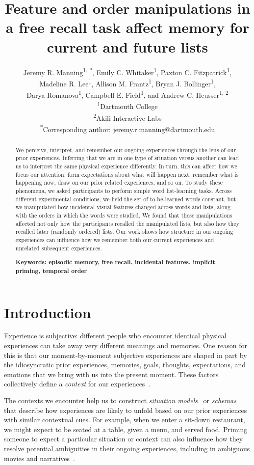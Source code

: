 \documentclass[11pt]{article}
\title{\Large Feature and order manipulations in a free recall task affect memory for current and future lists}
\author{Jeremy R. Manning\textsuperscript{1, *}, Emily C.
Whitaker\textsuperscript{1}, Paxton C. Fitzpatrick\textsuperscript{1},
\\Madeline R. Lee\textsuperscript{1}, Allison M. Frantz\textsuperscript{1},
Bryan J. Bollinger\textsuperscript{1},\\Darya Romanova\textsuperscript{1},
Campbell E. Field\textsuperscript{1}, and Andrew C. Heusser\textsuperscript{1,
2}\\\textsuperscript{1}Dartmouth College\\\textsuperscript{2}Akili
Interactive Labs\\\textsuperscript{*}Corresponding author:
jeremy.r.manning@dartmouth.edu}
\date{}
\begin{document}
\maketitle

\begin{abstract} \footnotesize{We perceive, interpret, and remember our ongoing
experiences through the lens of our prior experiences. Inferring that we are in
one type of situation versus another can lead us to interpret the same physical
experience differently. In turn, this can affect how we focus our attention,
form expectations about what will happen next, remember what is happening now,
draw on our prior related experiences, and so on. To study these phenomena, we
asked participants to perform simple word list-learning tasks. Across different
experimental conditions, we held the set of to-be-learned words constant, but
we manipulated how incidental visual features changed across words and lists,
along with the orders in which the words were studied. We found that these
manipulations affected not only how the participants recalled the manipulated
lists, but also how they recalled later (randomly ordered) lists. Our work
shows how structure in our ongoing experiences can influence how we remember
both our current experiences and unrelated subsequent experiences.

\textbf{Keywords: episodic memory, free recall, incidental features, implicit
priming, temporal order}}

\end{abstract}


\section*{Introduction}


Experience is subjective: different people who encounter identical physical
experiences can take away very different meanings and memories. One reason for this is
that our moment-by-moment subjective experiences are shaped in part by the
idiosyncratic prior experiences, memories, goals, thoughts, expectations, and
emotions that we bring with us into the present moment. These factors
collectively define a \textit{context} for our experiences~\citep{Mann20}.


The contexts we encounter help us to construct \textit{situation
models}~\citep{RangRitc12, MannEtal15, RadvCope06, ZwaaEtal95, ZwaaRadv98} or
\textit{schemas}~\citep{MasiEtal22, BaldEtal18, TseEtal07} that describe how
experiences are likely to unfold based on our prior experiences with similar
contextual cues. For example, when we enter a sit-down restaurant, we might
expect to be seated at a table, given a menu, and served food. Priming someone
to expect a particular situation or context can also influence how they resolve
potential ambiguities in their ongoing experiences, including in ambiguous
movies and narratives~\citep{YeshEtal17, RissEtal03}.
\end{document}

